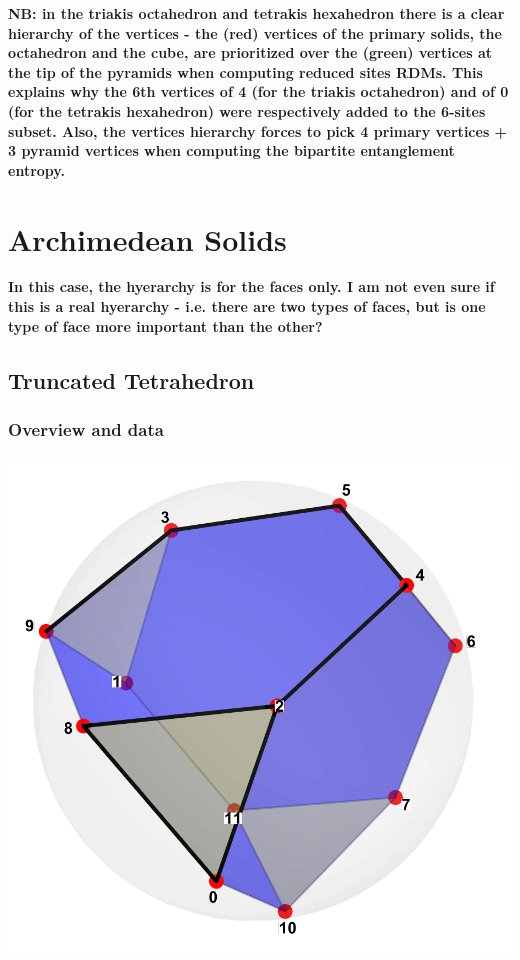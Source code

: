 \documentclass[11pt,a4paper]{article}
\begin{document}

\noindent\textbf{NB: in the triakis octahedron and tetrakis hexahedron there is a clear hierarchy of the vertices - the (red) vertices of the primary solids, the octahedron and the cube, are prioritized over the (green) vertices at the tip of the pyramids when computing reduced sites RDMs. This explains why the 6th vertices of 4 (for the triakis octahedron) and of 0 (for the tetrakis hexahedron) were respectively added to the 6-sites subset. Also, the vertices hierarchy forces to pick 4 primary vertices + 3 pyramid vertices when computing the bipartite entanglement entropy.}

\section*{Archimedean Solids}

\noindent\textbf{In this case, the hyerarchy is for the faces only. I am not even sure if this is a real hyerarchy - i.e. there are two types of faces, but is one type of face more important than the other?}


\subsection*{Truncated Tetrahedron}

\subsubsection*{Overview and data}
\begin{center}
  \includegraphics[width=.6\linewidth]{truncatedtetrahedron}
\end{center}
\end{document}
